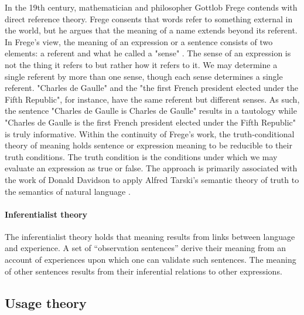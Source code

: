 In the 19th century, mathematician and philosopher Gottlob Frege contends with direct reference theory. Frege consents that words refer to something external in the world, but he argues that the meaning of a name extends beyond its referent. In Frege's view, the meaning of an expression or a sentence consists of two elements: a referent and what he called a "sense" \parencite{frege_1892}. The sense of an expression is not the thing it refers to but rather how it refers to it. We may determine a single referent by more than one sense, though each sense determines a single referent. "Charles de Gaulle" and the "the first French president elected under the Fifth Republic", for instance, have the same referent but different senses. As such, the sentence "Charles de Gaulle is Charles de Gaulle" results in a tautology while "Charles de Gaulle is the first French president elected under the Fifth Republic" is truly informative.
Within the continuity of Frege's work, the truth-conditional theory of meaning holds sentence or expression meaning to be reducible to their truth conditions. The truth condition is the conditions under which we may evaluate an expression as true or false. The approach is primarily associated with the work of Donald Davidson to apply Alfred Tarski's semantic theory of truth to the semantics of natural language \parencite{davidson_67}.



\paragraph{Inferentialist theory} The inferentialist theory holds that meaning results from links between language and experience. A set of “observation sentences” derive their meaning from an account of experiences upon which one can validate such sentences. The meaning of other sentences results from their inferential relations to other expressions.


\subsection{Usage theory}

